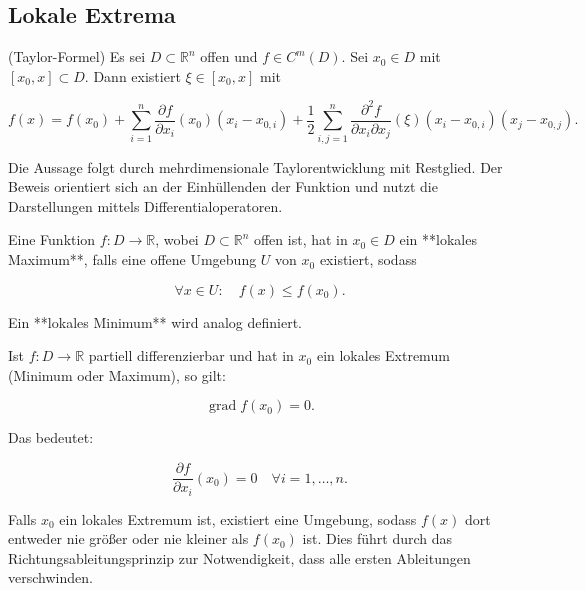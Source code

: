 \subsection{Lokale Extrema}

\begin{satz}{}
(Taylor-Formel)  
Es sei \(D \subset \mathbb{R}^n\) offen und \( f \in C^m(D) \). Sei \( x_0 \in D \) mit \( [x_0, x] \subset D \). Dann existiert \( \xi \in [x_0, x] \) mit


\[
f(x) = f(x_0) + \sum_{i=1}^{n} \frac{\partial f}{\partial x_i}(x_0) (x_i - x_{0,i}) + \frac{1}{2} \sum_{i,j=1}^{n} \frac{\partial^2 f}{\partial x_i \partial x_j} (\xi) (x_i - x_{0,i}) (x_j - x_{0,j}).
\]


\end{satz}

\begin{beweisbox}
Die Aussage folgt durch mehrdimensionale Taylorentwicklung mit Restglied. Der Beweis orientiert sich an der Einhüllenden der Funktion und nutzt die Darstellungen mittels Differentialoperatoren.  
\end{beweisbox}

\begin{definition}{}
Eine Funktion \( f: D \to \mathbb{R} \), wobei \( D \subset \mathbb{R}^n \) offen ist, hat in \( x_0 \in D \) ein **lokales Maximum**, falls eine offene Umgebung \( U \) von \( x_0 \) existiert, sodass


\[
\forall x \in U: \quad f(x) \leq f(x_0).
\]


Ein **lokales Minimum** wird analog definiert.
\end{definition}

\begin{lemma}
Ist \( f: D \to \mathbb{R} \) partiell differenzierbar und hat in \( x_0 \) ein lokales Extremum (Minimum oder Maximum), so gilt:


\[
\operatorname{grad} f(x_0) = 0.
\]


Das bedeutet:


\[
\frac{\partial f}{\partial x_i} (x_0) = 0 \quad \forall i=1,\dots,n.
\]


\end{lemma}

\begin{beweisbox}
Falls \( x_0 \) ein lokales Extremum ist, existiert eine Umgebung, sodass \( f(x) \) dort entweder nie größer oder nie kleiner als \( f(x_0) \) ist. Dies führt durch das Richtungsableitungsprinzip zur Notwendigkeit, dass alle ersten Ableitungen verschwinden.
\end{beweisbox}

